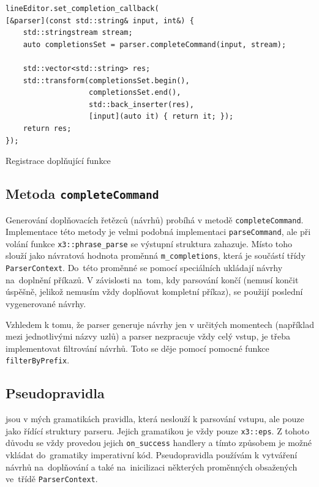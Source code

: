 \documentclass[thesis=B,czech,hidelinks]{FITthesis}[2019/03/06]
\begin{document}
\begin{listing}[H]
\begin{verbatim}
lineEditor.set_completion_callback(
[&parser](const std::string& input, int&) {
    std::stringstream stream;
    auto completionsSet = parser.completeCommand(input, stream);

    std::vector<std::string> res;
    std::transform(completionsSet.begin(),
                   completionsSet.end(),
                   std::back_inserter(res),
                   [input](auto it) { return it; });
    return res;
});
\end{verbatim}
\caption{Registrace doplňující funkce}\label{replxx:callback}
\end{listing}

\subsection{Metoda \texttt{completeCommand}}
Generování doplňovacích řetězců (návrhů) probíhá v metodě \texttt{completeCommand}. Implementace této metody je velmi podobná implementaci \texttt{parseCommand}, ale při volání funkce \texttt{x3::phrase\_parse} se výstupní struktura zahazuje. Místo toho slouží jako návratová hodnota proměnná \texttt{m\_completions}, která je součástí třídy \texttt{ParserContext}. Do~této proměnné se pomocí speciálních  ukládají návrhy na~doplnění příkazů. V závislosti na~tom, kdy parsování končí (nemusí končit úspěšně, jelikož nemusím vždy doplňovat kompletní příkaz), se použijí poslední vygenerované návrhy.

Vzhledem k tomu, že parser generuje návrhy jen v určitých momentech (například mezi jednotlivými názvy uzlů) a parser nezpracuje vždy celý vstup, je třeba implementovat filtrování návrhů. Toto se děje pomocí pomocné funkce \texttt{filterByPrefix}.

\subsection{Pseudopravidla}
 jsou v mých gramatikách pravidla, která neslouží k parsování vstupu, ale pouze jako řídící struktury parseru. Jejich gramatikou je vždy pouze \texttt{x3::eps}. Z tohoto důvodu se vždy provedou jejich \texttt{on\_success} handlery a tímto způsobem je možné vkládat do~gramatiky imperativní kód. Pseudopravidla používám k vytváření návrhů na~doplňování a také na~inicilizaci některých proměnných obsažených ve~třídě \texttt{ParserContext}.
\end{document}
